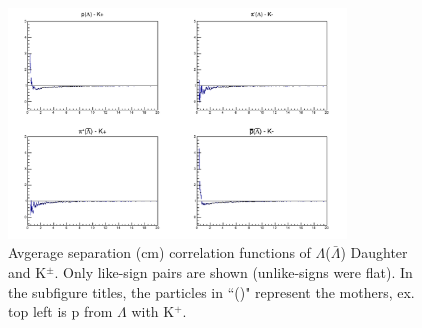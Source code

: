 \documentclass[../AnalysisNoteJBuxton.tex]{subfiles}
\begin{document}
\begin{figure}[h]
  \centering
  \includegraphics[width=0.8\textwidth]{3_DataSelection/Figures/AvgSepCFs_LamKch.pdf}
  \caption[Avgerage Separation of $\Lambda$($\bar{\Lambda}$) Daughter and K$^{\pm}$]{Avgerage separation (cm) correlation functions of $\Lambda$($\bar{\Lambda}$) Daughter and K$^{\pm}$.  Only like-sign pairs are shown (unlike-signs were flat).  In the subfigure titles, the particles in ``()" represent the mothers, ex. top left is p from $\Lambda$ with K$^{+}$.}
  \label{fig:AvgSepLamKch}
\end{figure}
\end{document}
